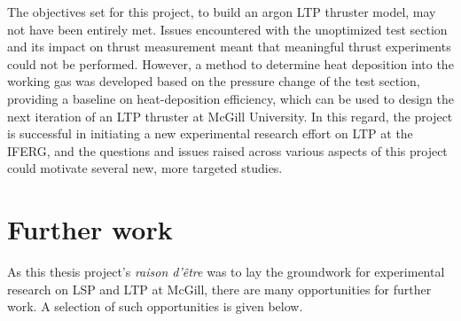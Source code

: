     The objectives set for this project, to build an argon LTP thruster model, may not have been entirely met. Issues encountered with the unoptimized test section and its impact on thrust measurement meant that meaningful thrust experiments could not be performed. However, a method to determine heat deposition into the working gas was developed based on the pressure change of the test section, providing a baseline on heat-deposition efficiency, which can be used to design the next iteration of an LTP thruster at McGill University. In this regard, the project is successful in initiating a new experimental research effort on LTP at the IFERG, and the questions and issues raised across various aspects of this project could motivate several new, more targeted studies.

    \section{Further work}
        As this thesis project's \emph{raison d'être} was to lay the groundwork for experimental research on LSP and LTP at McGill, there are many opportunities for further work. A selection of such opportunities is given below.

